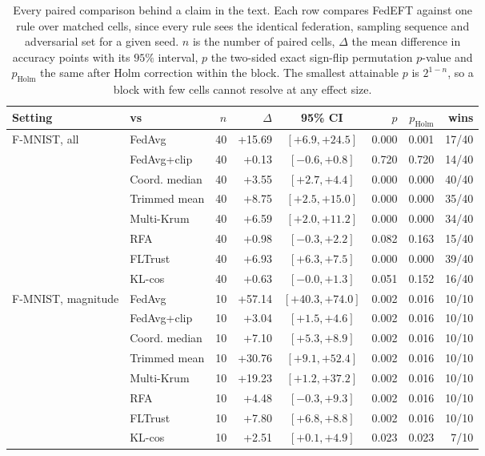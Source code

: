 \begin{table}[t]
\centering
\caption{Every paired comparison behind a claim in the text. Each row compares FedEFT against one rule over matched cells, since every rule sees the identical federation, sampling sequence and adversarial set for a given seed. $n$ is the number of paired cells, $\Delta$ the mean difference in accuracy points with its $95\%$ interval, $p$ the two-sided exact sign-flip permutation $p$-value and $p_{\mathrm{Holm}}$ the same after Holm correction within the block. The smallest attainable $p$ is $2^{1-n}$, so a block with few cells cannot resolve at any effect size.}
\label{tab:stats}
\setlength{\tabcolsep}{2.6pt}
\scriptsize
\begin{tabular}{@{}llrrcrrr@{}}
\toprule
Setting & vs & $n$ & $\Delta$ & 95\% CI & $p$ & $p_{\mathrm{Holm}}$ & wins\\
\midrule
F-MNIST, all & FedAvg & 40 & +15.69 & $[+6.9,+24.5]$ & 0.000 & 0.001 & 17/40\\
 & FedAvg+clip & 40 & +0.13 & $[-0.6,+0.8]$ & 0.720 & 0.720 & 14/40\\
 & Coord. median & 40 & +3.55 & $[+2.7,+4.4]$ & 0.000 & 0.000 & 40/40\\
 & Trimmed mean & 40 & +8.75 & $[+2.5,+15.0]$ & 0.000 & 0.000 & 35/40\\
 & Multi-Krum & 40 & +6.59 & $[+2.0,+11.2]$ & 0.000 & 0.000 & 34/40\\
 & RFA & 40 & +0.98 & $[-0.3,+2.2]$ & 0.082 & 0.163 & 15/40\\
 & FLTrust & 40 & +6.93 & $[+6.3,+7.5]$ & 0.000 & 0.000 & 39/40\\
 & KL-cos & 40 & +0.63 & $[-0.0,+1.3]$ & 0.051 & 0.152 & 16/40\\
\midrule
F-MNIST, magnitude & FedAvg & 10 & +57.14 & $[+40.3,+74.0]$ & 0.002 & 0.016 & 10/10\\
 & FedAvg+clip & 10 & +3.04 & $[+1.5,+4.6]$ & 0.002 & 0.016 & 10/10\\
 & Coord. median & 10 & +7.10 & $[+5.3,+8.9]$ & 0.002 & 0.016 & 10/10\\
 & Trimmed mean & 10 & +30.76 & $[+9.1,+52.4]$ & 0.002 & 0.016 & 10/10\\
 & Multi-Krum & 10 & +19.23 & $[+1.2,+37.2]$ & 0.002 & 0.016 & 10/10\\
 & RFA & 10 & +4.48 & $[-0.3,+9.3]$ & 0.002 & 0.016 & 10/10\\
 & FLTrust & 10 & +7.80 & $[+6.8,+8.8]$ & 0.002 & 0.016 & 10/10\\
 & KL-cos & 10 & +2.51 & $[+0.1,+4.9]$ & 0.023 & 0.023 & 7/10\\

\end{tabular}
\end{table}
